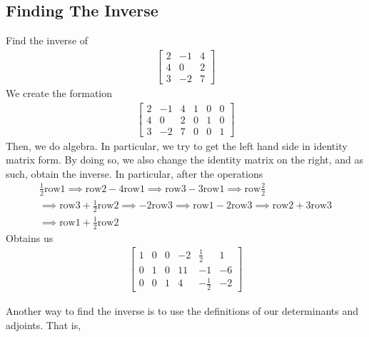 \documentclass[a4paper]{article}
\theoremstyle{plain}
\theoremstyle{definition}
\newtheorem{exmp}{Example}[section]
\theoremstyle{remark}
\begin{document}
\subsection{Finding The Inverse}
\begin{tcolorbox}[colback=black!3!white,colframe=black!60!white,title=\begin{exmp}Finding inverse \label{Finding inverse}\end{exmp}]
        Find the inverse of
                \begin{align}
			\begin{bmatrix} 2 & -1 & 4 \\
			4 & 0 & 2 \\
		3 & -2 & 7\end{bmatrix} 
                \end{align}
		We create the formation
		\begin{align}\left[
		\begin{array}{ccc|ccc}
			2 & -1 & 4 & 1 & 0 & 0 \\
			4 & 0 & 2 & 0 & 1 & 0 \\
			3 & -2 & 7 & 0 & 0 & 1
		\end{array}\right]
		\end{align}
		Then, we do algebra. In particular, we try to get the left hand side in identity matrix form. By doing so, we also change the identity matrix on the right, and as such, obtain the inverse. In particular, after the operations
		\begin{align*}
			\frac{1}{2}\text{row}1 \implies \text{row}2-4\text{row}1 \implies \text{row}3-3\text{row}1 \implies \text{row}\frac{2}{2} \\
			\implies \text{row}3+\frac{1}{2}\text{row}2 \implies -2\text{row}3 \implies \text{row}1 - 2\text{row}3 \implies \text{row}2+3\text{row}3 \\
			\implies\text{row}1 + \frac{1}{2}\text{row}2
		\end{align*}
		Obtains us
		\begin{align}
			\left[
		\begin{array}{ccc|ccc}
			1 & 0 & 0 & -2 & \frac{1}{2} & 1 \\
			0 & 1 & 0 & 11 & -1 & -6 \\
			0 & 0 & 1 & 4 & -\frac{1}{2} & -2
		\end{array}\right]
		\end{align}
\end{tcolorbox}
Another way to find the inverse is to use the definitions of our determinants and adjoints. That is,
\end{document}
